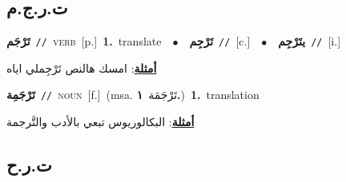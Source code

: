 \documentclass[10pt,a4paper,twoside]{article} %
\begin{document}
\begin{multicols}{2}
\vspace{-3mm}
\subsection*{\color{blue}\foreignlanguage{arabic}{ت.ر.ج.م}\color{blue}{}} 

{\setlength\topsep{0pt}\textbf{\foreignlanguage{arabic}{تَرْجَم}}\ {\color{gray}\texttt{//}\color{black}}\ \textsc{verb}\ [p.]\ \textbf{1.}~translate\ \ $\bullet$\ \ \setlength\topsep{0pt}\textbf{\foreignlanguage{arabic}{تَرْجِم}}\ {\color{gray}\texttt{//}\color{black}}\ [c.]\ \ $\bullet$\ \ \setlength\topsep{0pt}\textbf{\foreignlanguage{arabic}{يتَرْجِم}}\ {\color{gray}\texttt{//}\color{black}}\ [i.]\  \begin{flushright}\color{gray}\foreignlanguage{arabic}{\textbf{\underline{\foreignlanguage{arabic}{أمثلة}}}: امسك هالنص تَرْجِملي اياه}\end{flushright}\color{black}} \vspace{2mm}

{\setlength\topsep{0pt}\textbf{\foreignlanguage{arabic}{تَرْجَمِة}}\ {\color{gray}\texttt{//}\color{black}}\ \textsc{noun}\ [f.]\ \color{gray}(msa. \foreignlanguage{arabic}{تَرْجَمَة}~\foreignlanguage{arabic}{\textbf{١.}})\color{black}\ \textbf{1.}~translation\  \begin{flushright}\color{gray}\foreignlanguage{arabic}{\textbf{\underline{\foreignlanguage{arabic}{أمثلة}}}: البكالوريوس تبعي بالأدب والتَّرجمة}\end{flushright}\color{black}} \vspace{2mm}

\vspace{-3mm}
\subsection*{\color{blue}\foreignlanguage{arabic}{ت.ر.ح}\color{blue}{}} 


\end{multicols}
\end{document}
